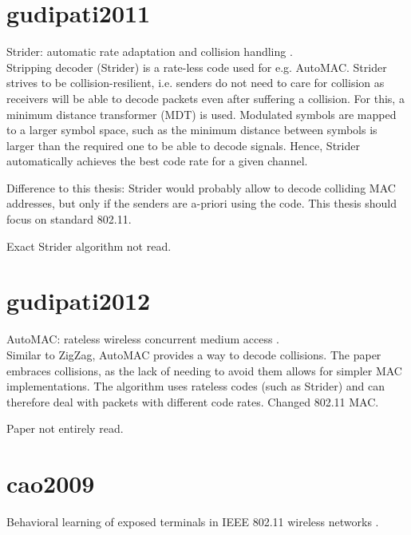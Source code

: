 \section*{gudipati2011}

Strider: automatic rate adaptation and collision handling \cite{gudipati2011}.\\

Stripping decoder (Strider) is a rate-less code used for e.g. AutoMAC. Strider strives to be collision-resilient, i.e. senders do not need to care for collision as receivers will be able to decode packets even after suffering a collision. For this, a minimum distance transformer (MDT) is used. Modulated symbols are mapped to a larger symbol space, such as the minimum distance between symbols is larger than the required one to be able to decode signals. Hence, Strider automatically achieves the best code rate for a given channel.

Difference to this thesis: Strider would probably allow to decode colliding MAC addresses, but only if the senders are a-priori using the code. This thesis should focus on standard 802.11.

Exact Strider algorithm not read.



\section*{gudipati2012}

AutoMAC: rateless wireless concurrent medium access \cite{gudipati2012}.\\

Similar to ZigZag, AutoMAC provides a way to decode collisions. The paper embraces collisions, as the lack of needing to avoid them allows for simpler MAC implementations. The algorithm uses rateless codes (such as Strider) and can therefore deal with packets with different code rates. Changed 802.11 MAC.

Paper not entirely read.



\section*{cao2009}

Behavioral learning of exposed terminals in IEEE 802.11 wireless networks \cite{cao2009}.\\

